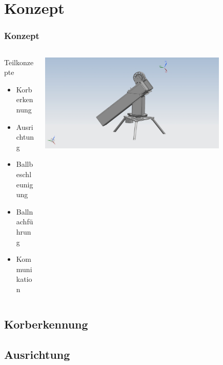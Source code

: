\section{Konzept} %
\begin{frame}
    \frametitle{Konzept}
    \begin{columns}
        \begin{column}{0.4\textwidth}
            \begin{block}{Teilkonzepte}
                \begin{itemize}
                    \item Korberkennung
                    \item Ausrichtung
                    \item Ballbeschleunigung
                    \item Ballnachführung
                    \item Kommunikation
                \end{itemize}
            \end{block}
        \end{column}
        \begin{column}{0.6\textwidth}
            \centering
            \includegraphics[width=0.8\textwidth, trim = 150mm 50 150mm 10, clip]{../doc/fig/Gesamt_bg1.jpg}
        \end{column}
    \end{columns}
\end{frame}

\subsection{Korberkennung}



\subsection{Ausrichtung}


